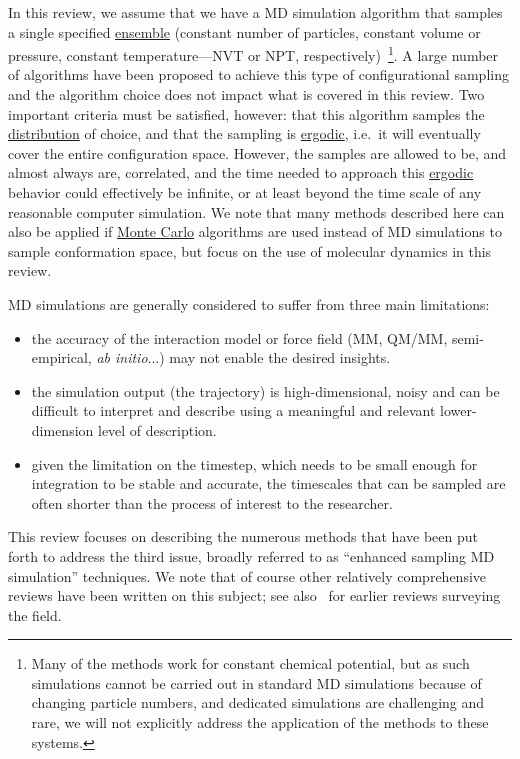 \documentclass[9pt,review]{livecoms}
\begin{document}
In this review, we assume that we have a MD simulation algorithm that samples a single specified \hyperlink{ref:Ensemble} {ensemble} (constant number of particles, constant volume or pressure, constant temperature---NVT or NPT, respectively)~\footnote{Many of the methods work for constant chemical potential, but as such simulations cannot be carried out in standard MD simulations because of changing particle numbers, and dedicated simulations are challenging and rare, we will not explicitly address the application of the methods to these systems.}. A large number of algorithms have been proposed to achieve this type of configurational sampling and the algorithm choice does not impact what is covered in this review. Two important criteria must be satisfied, however: that this algorithm samples the \hyperlink{ref:Distribution} {distribution} of choice, and that the sampling is \hyperlink{ref:ergodic} {ergodic}, i.e.~it will eventually cover the entire configuration space. However, the samples are allowed to be, and almost always are, correlated, and the time needed to approach this \hyperlink{ref:ergodic} {ergodic} behavior could effectively be infinite, or at least beyond the time scale of any reasonable computer simulation. We note that many methods described here can also be applied if \hyperlink{ref:MetropolisMonteCarlo} {Monte Carlo} algorithms are used instead of MD simulations to sample conformation space, but focus on the use of molecular dynamics in this review.

MD simulations are generally considered to suffer from three main limitations:
\begin{itemize}
    \item the accuracy of the interaction model or force field (MM, QM/MM, semi-empirical, \emph{ab initio}...) may not enable the desired insights.
    \item the simulation output (the trajectory) is high-dimensional, noisy and can be difficult to interpret and describe using a meaningful and relevant lower-dimension level of description.
    \item given the limitation on the timestep, which needs to be small enough for integration to be stable and accurate, the timescales that can be sampled are often shorter than the process of interest to the researcher.
\end{itemize}

This review focuses on describing the numerous methods that have been put forth to address the third issue, broadly referred to as ``enhanced sampling MD simulation'' techniques. We note that of course other relatively comprehensive reviews have been written on this subject; see also~\cite{10.1016/j.bbagen.2014.10.019,10.1063/1.5109531,10.1039/d1cp04809k} for earlier reviews surveying the field.
\end{document}
